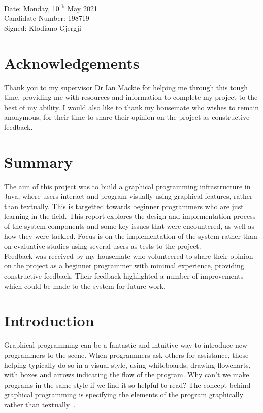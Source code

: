 \documentclass[a4paper, 12pt]{article}
\begin{document}
        Date: Monday, 10\textsuperscript{th} May 2021 \\

        Candidate Number: 198719 \\

        Signed: Klodiano Gjergji

    \section*{Acknowledgements}
        Thank you to my supervisor Dr Ian Mackie for helping me through this tough time,
        providing me with resources and information to complete my project to the best
        of my ability. I would also like to thank my housemate who wishes to remain
        anonymous, for their time to share their opinion on the project as constructive
        feedback.

    \section*{Summary}
        The aim of this project was to build a graphical programming infrastructure in Java, where users
        interact and program visually using graphical features, rather than textually. This is
        targetted towards beginner programmers who are just learning in the field. This report
        explores the design and implementation process of the system components and some key
        issues that were encountered, as well as how they were tackled. Focus is on the implementation
        of the system rather than on evaluative studies using several users as tests to the project. \\

        Feedback was received by my housemate who volunteered to share their opinion on
        the project as a beginner programmer with minimal experience, providing constructive
        feedback. Their feedback highlighted a number of improvements which could be made to the
        system for future work.

    \newpage\clearpage\thispagestyle{empty}
    \tableofcontents
    \newpage
    \setcounter{page}{1}

    \section{Introduction}
    Graphical programming can be a fantastic and intuitive way to introduce new programmers to
    the scene. When programmers ask others for assistance, those helping typically do so in a visual 
    style, using whiteboards, drawing flowcharts, with boxes and arrows indicating the flow 
    of the program. Why can't we make programs in the same style if we find it so helpful to read? 
    The concept behind graphical programming is specifying the elements of the program graphically 
    rather than textually~\cite{dehouck2015maturity}. \\
\end{document}
